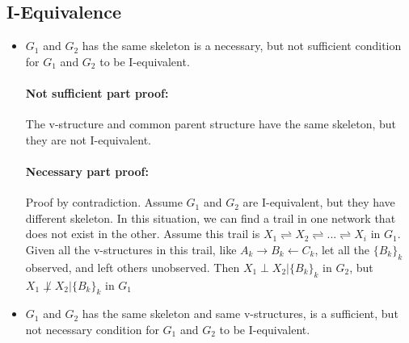 \documentclass[twoside]{article}
\begin{document}
\subsection{I-Equivalence}
\begin{itemize}
\item $G_1$ and $G_2$ has the same skeleton is a necessary, but not sufficient condition for $G_1$ and $G_2$ to be I-equivalent.
\paragraph{Not sufficient part proof:} The v-structure and common parent structure have the same skeleton, but they are not I-equivalent.
\paragraph{Necessary part proof:} Proof by contradiction. Assume $G_1$ and $G_2$ are I-equivalent, but they have different skeleton. In this situation, we can find a trail in one network that does not exist in the other. Assume this trail is $X_1 \rightleftharpoons X_2 \rightleftharpoons ... \rightleftharpoons X_i$ in $G_1$. Given all the v-structures in this trail, like $A_k\rightarrow B_k \leftarrow C_k$, let all the $\{B_k\}_{k}$ observed, and left others unobserved. Then $X_1 \perp X_2 | \{B_k\}_{k}$ in $G_2$, but  $X_1 \not\perp X_2 | \{B_k\}_{k}$ in $G_1$
\item $G_1$ and $G_2$ has the same skeleton and same v-structures, is a sufficient, but not necessary condition for $G_1$ and $G_2$ to be I-equivalent.

\end{itemize}
\end{document}
